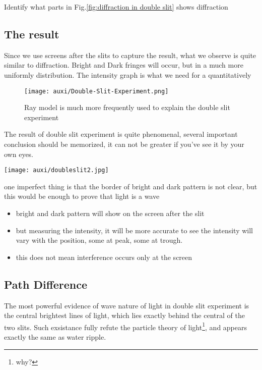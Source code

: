 \documentclass[a4paper]{tufte-handout}
\newenvironment{TaskBox} %
{\begin{tcolorbox}[breakable,colback=b1!30,colframe=b1,title=Task]} {\end{tcolorbox}}
\newenvironment{SummBox}
{\begin{tcolorbox}[breakable,colback=r1!30,colframe=r1,title=Summary]} {\end{tcolorbox}}
\begin{document}
\begin{TaskBox}
Identify what parts in Fig.\ref{fig:diffraction in double slit} shows diffraction
\end{TaskBox}

\subsection{The result}
Since we use screens after the slits to capture the result, what we observe is quite similar to diffraction. Bright and Dark fringes will occur, but in a much more uniformly distribution. The intensity graph is what we need for a quantitatively
\begin{figure}[h]
\centering
\texttt{[image: auxi/Double-Slit-Experiment.png]}
\caption{Ray model is much more frequently used to explain the double slit experiment}
\end{figure}

\begin{SummBox}
The result of double slit experiment is quite phenomenal, several important conclusion should be memorized, it can not be greater if you've see it by your own eyes.

\begin{marginfigure}
\texttt{[image: auxi/doubleslit2.jpg]}
\caption{one imperfect thing is that the border of bright and dark pattern is not clear, but this would be enough to prove that light is a wave}
\end{marginfigure}

\begin{itemize}
  \item bright and dark pattern will show on the screen after the slit
  \item but measuring the intensity, it will be more accurate to see the intensity will vary with the position, some at peak, some at trough.
  \item this does not mean interference occurs only at the screen
\end{itemize}
\end{SummBox}


\subsection{Path Difference}
The most powerful evidence of wave nature of light in double slit experiment is the central brightest lines of light, which lies exactly behind the central of the two slits. Such exsistance fully refute the particle theory of light\footnote{why?}, and appears exactly the same as water ripple. 
\end{document}
